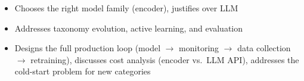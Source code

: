 \begin{interviewq}

\goodgreat
\begin{itemize}
    \item {} Chooses the right model family (encoder), justifies over LLM
    \item {} Addresses taxonomy evolution, active learning, and evaluation
    \item {} Designs the full production loop (model $\to$ monitoring $\to$ data collection $\to$ retraining), discusses cost analysis (encoder vs.\ LLM API), addresses the cold-start problem for new categories
\end{itemize}

\end{interviewq}

